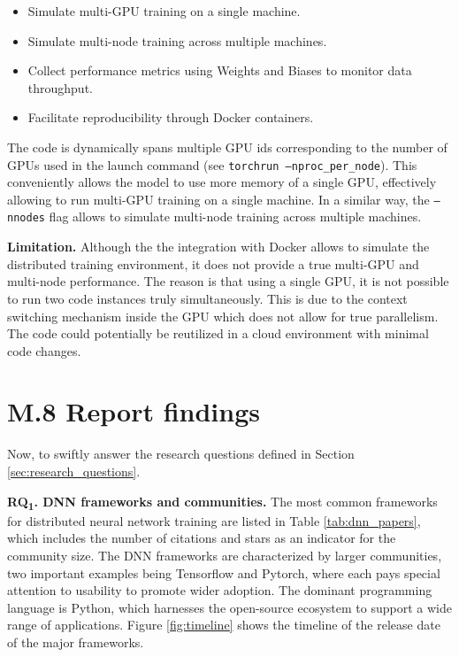 \begin{itemize}
	\item Simulate multi-GPU training on a single machine.
	\item Simulate multi-node training across multiple machines.
	\item Collect performance metrics using Weights and Biases to monitor data throughput.
	\item Facilitate reproducibility through Docker containers.
\end{itemize}

The code is dynamically spans multiple GPU ids corresponding to the number of GPUs used in the
launch command (see \texttt{torchrun --nproc\_per\_node}). This conveniently allows the model to
use more memory of a single GPU, effectively allowing to run multi-GPU training on a single
machine. In a similar way, the \texttt{--nnodes} flag allows to simulate multi-node training across
multiple machines.

\textbf{Limitation.}
Although the the integration with Docker allows to simulate the distributed training
environment, it does not provide a true multi-GPU and multi-node performance. The reason is that
using a single GPU, it is not possible to run two code instances truly simultaneously. This is due
to the context switching mechanism inside the GPU which does not allow for true parallelism. The
code could potentially be reutilized in a cloud environment with minimal code changes.

\section{M.8 Report findings}
\label{sec:report-findings}
Now, to swiftly answer the research questions defined in Section \ref{sec:research_questions}.

\textbf{RQ\textsubscript{1}. DNN frameworks and communities.}
The most common frameworks for distributed neural network training are listed in Table
\ref{tab:dnn_papers}, which includes the number of citations and stars as an indicator for the community
size. The DNN frameworks are characterized by larger communities, two important examples being
Tensorflow and Pytorch, where each pays special attention to usability to promote wider adoption.
The dominant programming language is Python, which harnesses the open-source ecosystem to support a
wide range of applications. Figure \ref{fig:timeline} shows the timeline of the release date of the
major frameworks.

